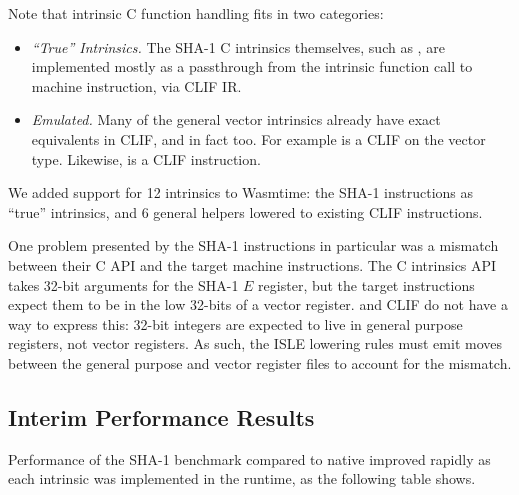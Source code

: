 Note that intrinsic C function handling fits in two categories:
\begin{itemize}
    \item \emph{``True'' Intrinsics.}
        The SHA-1 C intrinsics themselves, such as , are
        implemented mostly as a passthrough from the intrinsic function call to
        machine instruction, via CLIF IR.
    \item \emph{Emulated.}
        Many of the general vector intrinsics already have exact equivalents in
        CLIF, and in fact \wasm too.  For example  is a CLIF
         on the vector  type.  Likewise,
         is a CLIF  instruction.
\end{itemize}

We added support for 12 intrinsics to Wasmtime: the SHA-1 instructions as
``true'' intrinsics, and 6 general helpers lowered to existing CLIF
instructions.

One problem presented by the SHA-1 instructions in particular was a mismatch
between their C API and the target machine instructions.  The C intrinsics API
takes 32-bit arguments for the SHA-1 $E$ register, but the target instructions
expect them to be in the low 32-bits of a vector register. \wasm and CLIF do not
have a way to express this: 32-bit integers are expected to live in general
purpose registers, not vector registers. As such, the ISLE lowering rules must
emit moves between the general purpose and vector register files to account for
the mismatch.

\subsection{Interim Performance Results}
\label{sec:interimresults}

Performance of the SHA-1 benchmark compared to native improved rapidly as each
intrinsic was implemented in the runtime, as the following table shows.

\newcommand{\changeshaonec}{Intrinsic: \code{vsha1cq\_u32}}
\newcommand{\changeshaonepm}{Intrinsics: \code{vsha1\{p,m\}q\_u32}}
\newcommand{\changeshaoneh}{Intrinsic: \code{vsha1h\_u32}}
\newcommand{\changeshaonesuzero}{Intrinsic: \code{vsha1su0q\_u32}}
\newcommand{\changeshaonesuone}{Intrinsic: \code{vsha1su1q\_u32}}
\newcommand{\changevaddqu}{Intrinsic: \code{vaddq\_u32}}
\newcommand{\changevdupqnu}{Intrinsic: \code{vdupq\_n\_u32}}
\newcommand{\changevgetqlaneu}{Intrinsic: \code{vgetq\_lane\_u32}}
\newcommand{\changevreinterpretq}{Intrinsics: \code{vreinterpretq\_\{u32\_u8,u8\_u32\}}}
\newcommand{\changevrevqu}{Intrinsic: \code{vrev32q\_u8}}

